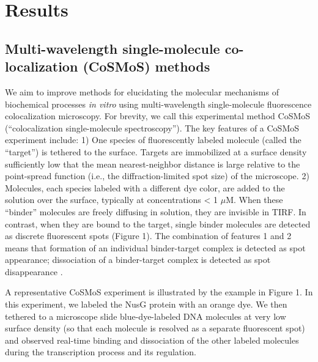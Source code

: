 \section{Results}

\subsection{Multi-wavelength single-molecule co-localization (CoSMoS) methods}

We aim to improve methods for elucidating the molecular mechanisms of biochemical processes \textit{in vitro} using multi-wavelength single-molecule fluorescence colocalization microscopy. For brevity, we call this experimental method CoSMoS (“colocalization single-molecule spectroscopy”). The key features of a CoSMoS experiment include: 1) One species of fluorescently labeled molecule (called the “target”) is tethered to the surface. Targets are immobilized at a surface density sufficiently low that the mean nearest-neighbor distance is large relative to the point-spread function (i.e., the diffraction-limited spot size) of the microscope. 2) Molecules, each species labeled with a different dye color, are added to the solution over the surface, typically at concentrations < 1 $\mu$M. When these “binder” molecules are freely diffusing in solution, they are invisible in TIRF. In contrast, when they are bound to the target, single binder molecules are detected as discrete fluorescent spots (Figure 1). The combination of features 1 and 2 means that formation of an individual binder-target complex is detected as spot appearance; dissociation of a binder-target complex is detected as spot disappearance \citep{Friedman2006-kb, Friedman2015-nx}.

A representative CoSMoS experiment is illustrated by the example in Figure 1. In this experiment, we labeled the NusG protein with an orange dye. We then tethered to a microscope slide blue-dye-labeled DNA molecules at very low surface density (so that each molecule is resolved as a separate fluorescent spot) and observed real-time binding and dissociation of the other labeled molecules during the transcription process and its regulation.

